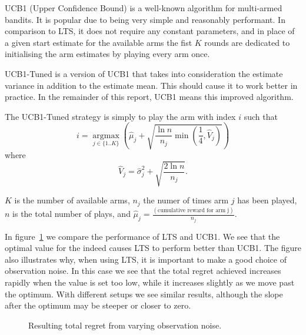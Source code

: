 UCB1 \cite{Auer02UCB1} (Upper Confidence Bound) is a well-known algorithm for multi-armed bandits.
It is popular due to being very simple and reasonably performant. In comparison 
to LTS, it does not require any constant parameters, and in place of a given 
start estimate for the available arms the fist $K$ rounds are dedicated to 
initialising the arm estimates by playing every arm once.

UCB1-Tuned is a version of UCB1 that takes into consideration the estimate variance in addition to the estimate mean.
This should cause it to work better in practice.
In the remainder of this report, UCB1 means this improved algorithm.

The UCB1-Tuned strategy is simply to play the arm with index $i$ such that
\begin{displaymath}
    i = \operatorname*{argmax}_{j \in \{ 1..K \}} \left(\hat{\mu}_j + 
    \sqrt{\frac{\ln{n}}{n_j} \min(\frac{1}{4},\hat{V}_j)}\right)
\end{displaymath}
where 
\begin{displaymath}
    \hat{V}_j = \hat{\sigma}_j^2 + \sqrt{\frac{2\ln{n}}{n_j}}\text{.}
\end{displaymath}

$K$ is the number of available arms, $n_j$ the numer of times arm $j$ has 
been played, $n$ is the total number of plays, and $\hat{\mu}_j 
=\frac{(\text{cumulative reward for arm j})}{n_j}$.

In figure~\ref{fig:regretob} we compare the performance of LTS and UCB1.
We see that the optimal value for the \ob{} indeed causes LTS to perform better than UCB1.
The figure also illustrates why, when using LTS, it is important to make a good choice of observation noise.
In this case we see that the total regret achieved increases rapidly when the value is set too low, while it increases slightly as we move past the optimum.
With different setups we see similar results, although the slope after the optimum may be steeper or closer to zero.

\begin{figure}[htbp]
    \hspace*{-2.5cm}
    \begin{minipage}[c]{0.39\textwidth}
    \end{minipage}
    \hspace*{7.5cm}
    \begin{minipage}[c]{0.49\textwidth}
    \end{minipage}
\caption{Resulting total regret from varying observation noise.}
\label{fig:regretob}
\end{figure}

